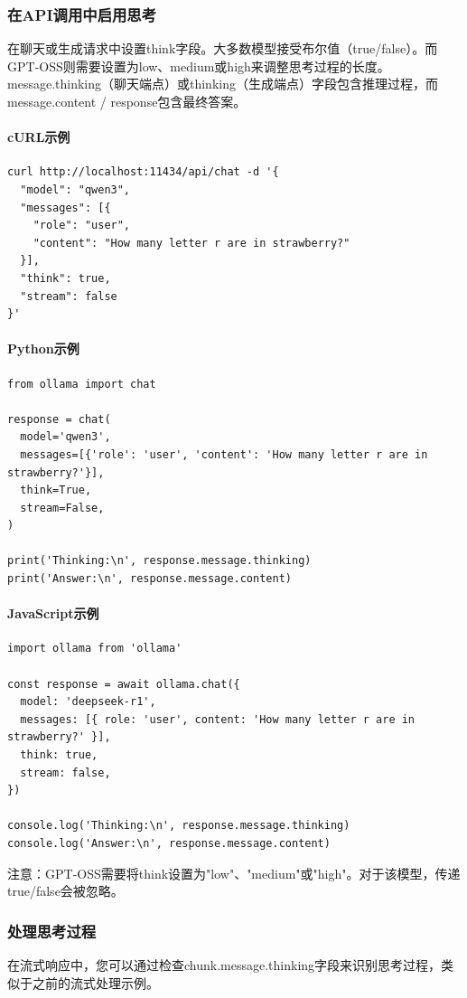 \documentclass[12pt,UTF8]{ctexbook}
\begin{document}
\subsubsection{在API调用中启用思考}
在聊天或生成请求中设置think字段。大多数模型接受布尔值（true/false）。而GPT-OSS则需要设置为low、medium或high来调整思考过程的长度。message.thinking（聊天端点）或thinking（生成端点）字段包含推理过程，而message.content / response包含最终答案。

\paragraph{cURL示例}
\begin{verbatim}
curl http://localhost:11434/api/chat -d '{
  "model": "qwen3",
  "messages": [{
    "role": "user",
    "content": "How many letter r are in strawberry?"
  }],
  "think": true,
  "stream": false
}'
\end{verbatim}

\paragraph{Python示例}
\begin{verbatim}
from ollama import chat

response = chat(
  model='qwen3',
  messages=[{'role': 'user', 'content': 'How many letter r are in strawberry?'}],
  think=True,
  stream=False,
)

print('Thinking:\n', response.message.thinking)
print('Answer:\n', response.message.content)
\end{verbatim}

\paragraph{JavaScript示例}
\begin{verbatim}
import ollama from 'ollama'

const response = await ollama.chat({
  model: 'deepseek-r1',
  messages: [{ role: 'user', content: 'How many letter r are in strawberry?' }],
  think: true,
  stream: false,
})

console.log('Thinking:\n', response.message.thinking)
console.log('Answer:\n', response.message.content)
\end{verbatim}

注意：GPT-OSS需要将think设置为"low"、"medium"或"high"。对于该模型，传递true/false会被忽略。

\subsubsection{处理思考过程}
在流式响应中，您可以通过检查chunk.message.thinking字段来识别思考过程，类似于之前的流式处理示例。
\end{document}
